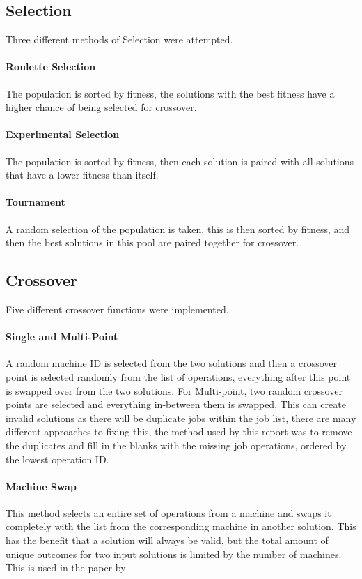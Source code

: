 \documentclass[14pt]{acmsiggraph}
\begin{document}
	\subsection{Selection}
	Three different methods of Selection were attempted.
	
	\paragraph{Roulette Selection}
	The population is sorted by fitness, the solutions with the best fitness have a higher chance of being selected for crossover.
	
	\paragraph{Experimental Selection}
	The population is sorted by fitness, then each solution is paired with all solutions that have a lower fitness than itself.
	
	\paragraph{Tournament}
	A random selection of the population is taken, this is then sorted by fitness, and then the best solutions in this pool are paired together for crossover.
	
	\subsection{Crossover}
	Five different crossover functions were implemented.
	\paragraph{Single and Multi-Point}
	A random machine ID is selected from the two solutions and then a crossover point is selected randomly from the list of operations, everything after this point is swapped over from the two solutions. For Multi-point, two random crossover points are selected and everything in-between them is swapped. This can create invalid solutions as there will be duplicate jobs within the job list, there are many different approaches to fixing this, the method used by this report was to remove the duplicates and fill in the blanks with the missing job operations, ordered by the lowest operation ID.
	
	\paragraph{Machine Swap}
	This method selects an entire set of operations from a machine and swaps it completely with the list from the corresponding machine in another solution. This has the benefit that a solution will always be valid, but the total amount of unique outcomes  for two input solutions is limited by the number of machines. This is used in the paper by \cite{wang2012new}
	
\end{document}
